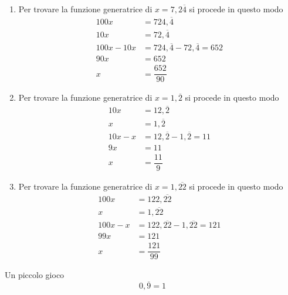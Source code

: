 	\begin{enumerate}
		\item Per trovare la funzione generatrice di $x=7{,}2\overline{4}$ si procede in questo modo
		\begin{align*}
		100x &=724{,}\overline{4}\\
		10x &=72{,}\overline{4}\\
		100x-10x&=724{,}\overline{4}-72{,}\overline{4}=652\\
		90x&=652\\
		x&=\dfrac{652}{90}
		\end{align*}
		\item Per trovare la funzione generatrice di $x=1{,}\overline{2}$ si procede in questo modo
		\begin{align*}
		10x &=12{,}\overline{2}\\
		x &=1{,}\overline{2}\\
		10x-x&=12{,}\overline{2}-1{,}\overline{2}=11\\
		9x&=11\\
		x&=\dfrac{11}{9}
		\end{align*}
		\item Per trovare la funzione generatrice di $x=1{,}\overline{22}$ si procede in questo modo
		\begin{align*}
		100x &=122{,}\overline{22}\\
		x &=1{,}\overline{22}\\
		100x-x&=122{,}\overline{22}-1{,}\overline{22}=121\\
		99x&=121\\
		x&=\dfrac{121}{99}
		\end{align*}
	\end{enumerate}
	Un piccolo gioco 
\[0{,}\overline{9}=1\]
